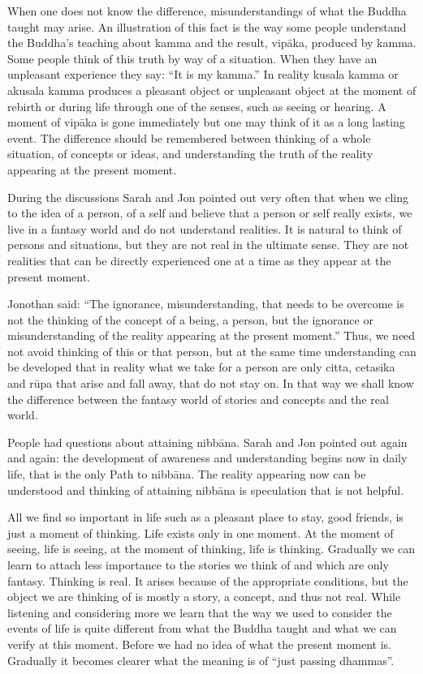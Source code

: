 {When one does not know the difference, misunderstandings of
what the Buddha taught may arise. An illustration of this fact is the
way some people understand the Buddha's teaching about kamma and the
result, vipāka, produced by kamma. Some people think of this truth by
way of a situation. When they have an unpleasant experience they say:
``It is my kamma.'' In reality kusala kamma or akusala kamma produces a
pleasant object or unpleasant object at the moment of rebirth or during
life through one of the senses, such as seeing or hearing. A moment of
vipāka is gone immediately but one may think of it as a long lasting
event. The difference should be remembered between thinking of a whole
situation, of concepts or ideas, and understanding the truth of the
reality appearing at the present moment. 

During the discussions Sarah and Jon pointed out very often
that when we cling to the idea of a person, of a self and believe that a
person or self really exists, we live in a fantasy world and do not
understand realities. It is natural to think of persons and situations,
but they are not real in the ultimate sense. They are not realities that
can be directly experienced one at a time as they appear at the present
moment. 

Jonothan said: ``The ignorance, misunderstanding, that needs
to be overcome is not the thinking of the concept of a being, a person,
but the ignorance or misunderstanding of the reality appearing at the
present moment.'' Thus, we need not avoid thinking of this or that
person, but at the same time understanding can be developed that in
reality what we take for a person are only citta, cetasika and rūpa that
arise and fall away, that do not stay on. In that way we shall know the
difference between the fantasy world of stories and concepts and the
real world. 

People had questions about attaining nibbāna. Sarah and Jon
pointed out again and again: the development of awareness and
understanding begins now in daily life, that is the only Path to
nibbāna. The reality appearing now can be understood and thinking of
attaining nibbāna is speculation that is not helpful. 

All we find so important in life such as a pleasant place to
stay, good friends, is just a moment of thinking. Life exists only in
one moment. At the moment of seeing, life is seeing, at the moment of
thinking, life is thinking. Gradually we can learn to attach less
importance to the stories we think of and which are only fantasy.
Thinking is real. It arises because of the appropriate conditions, but
the object we are thinking of is mostly a story, a concept, and thus not
real. While listening and considering more we learn that the way we used
to consider the events of life is quite different from what the Buddha
taught and what we can verify at this moment. Before we had no idea of
what the present moment is. Gradually it becomes clearer what the
meaning is of ``just passing dhammas''.

}
